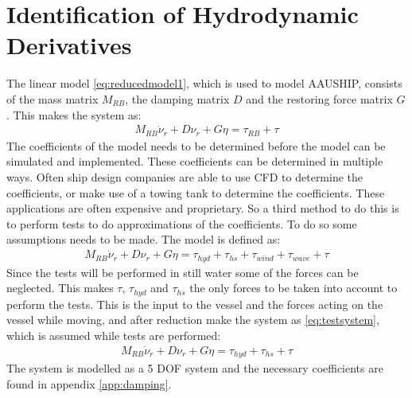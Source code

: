 \section{Identification of Hydrodynamic Derivatives}
\label{sec:hydrocoeff}
The linear model \eqref{eq:reducedmodel1}, which is used to model AAUSHIP, consists of the mass matrix $M_{RB}$, the damping matrix $D$ and the restoring force matrix $G$. This makes the system as:
\begin{align}
M_{RB} \dot \nu_r + D\nu_r + G\eta = \tau_{RB} + \tau
\label{eq:reducedmodel1}
\end{align}
The coefficients of the model needs to be determined before the model can be simulated and implemented. These coefficients can be determined in multiple ways. Often ship design companies are able to use \ac{CFD} to determine the coefficients, or make use of a towing tank to determine the coefficients. These applications are often expensive and proprietary. So a third method to do this is to perform tests to do approximations of the coefficients. To do so some assumptions needs to be made. The model is defined as:
\begin{align}
M_{RB} \dot \nu_r + D\nu_r + G\eta = \tau_{hyd} + \tau_{hs} + \tau_{wind} + \tau_{wave} + \tau
\end{align}
Since the tests will be performed in still water some of the forces can be neglected. This makes $\tau$, $\tau_{hyd}$ and $\tau_{hs}$ the only forces to be taken into account to perform the tests. This is the input to the vessel and the forces acting on the vessel while moving, and after reduction make the system as \ref{eq:testsystem}, which is assumed while tests are performed:
\begin{align}
M_{RB} \dot \nu_r + D\nu_r + G\eta = \tau_{hyd} + \tau_{hs} + \tau
\label{eq:testsystem}
\end{align}
The system is modelled as a 5 \ac{DOF} system and the necessary coefficients are found in appendix \ref{app:damping}.

